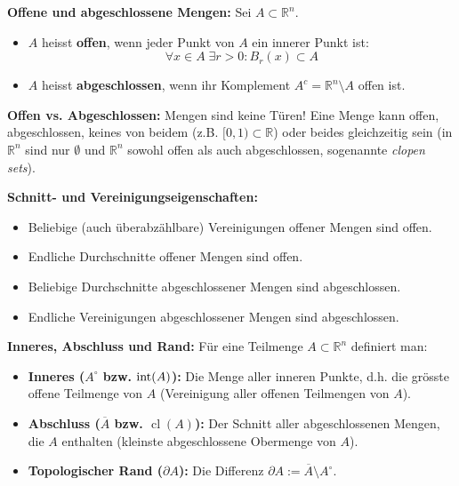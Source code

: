 \begin{definition}
    \textbf{Offene und abgeschlossene Mengen:} Sei $A \subset \mathbb{R}^n$.
    \begin{itemize}
        \item $A$ heisst \textbf{offen}, wenn jeder Punkt von $A$ ein innerer Punkt ist:
        $$ \forall x \in A \; \exists r > 0: B_r(x) \subset A $$
        \item $A$ heisst \textbf{abgeschlossen}, wenn ihr Komplement $A^c = \mathbb{R}^n \setminus A$ offen ist.
    \end{itemize}
\end{definition}

\begin{important}
    \textbf{Offen vs. Abgeschlossen:} Mengen sind keine Türen! Eine Menge kann offen, abgeschlossen, keines von beidem (z.B. $[0, 1) \subset \mathbb{R}$) oder beides gleichzeitig sein (in $\mathbb{R}^n$ sind nur $\emptyset$ und $\mathbb{R}^n$ sowohl offen als auch abgeschlossen, sogenannte \textit{clopen sets}).
\end{important}

\begin{lemma}
    \textbf{Schnitt- und Vereinigungseigenschaften:}
    \begin{itemize}
        \item Beliebige (auch überabzählbare) Vereinigungen offener Mengen sind offen.
        \item Endliche Durchschnitte offener Mengen sind offen.
        \item Beliebige Durchschnitte abgeschlossener Mengen sind abgeschlossen.
        \item Endliche Vereinigungen abgeschlossener Mengen sind abgeschlossen.
    \end{itemize}
\end{lemma}

\begin{definition}
    \textbf{Inneres, Abschluss und Rand:} Für eine Teilmenge $A \subset \mathbb{R}^n$ definiert man:
    \begin{itemize}
        \item \textbf{Inneres ($A^\circ$ bzw. $\operatorname{int}(A)$):} Die Menge aller inneren Punkte, d.h. die grösste offene Teilmenge von $A$ (Vereinigung aller offenen Teilmengen von $A$).
        \item \textbf{Abschluss ($\overline{A}$ bzw. $\operatorname{cl}(A)$):} Der Schnitt aller abgeschlossenen Mengen, die $A$ enthalten (kleinste abgeschlossene Obermenge von $A$).
        \item \textbf{Topologischer Rand ($\partial A$):} Die Differenz $\partial A := \overline{A} \setminus A^\circ$.
    \end{itemize}
\end{definition}

